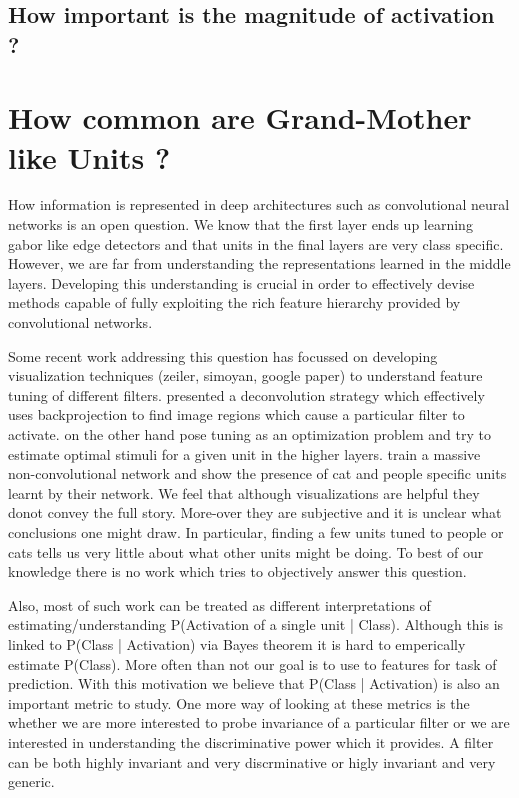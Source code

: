 \documentclass[runningheads]{llncs}
\begin{document}
\subsection{How important is the magnitude of activation ?}
\label{sub:imp-mag}





\section{How common are Grand-Mother like Units ?}
How information is represented in deep architectures such as convolutional neural networks is an open question. We know that the first layer ends up learning gabor like edge detectors and that units in the final layers are very class specific. However, we are far from understanding the representations learned in the middle layers. Developing this understanding is crucial in order to effectively devise methods capable of fully exploiting the rich feature hierarchy provided by convolutional networks.

Some recent work addressing this question has focussed on developing visualization techniques (zeiler, simoyan, google paper) to understand feature tuning of different filters. \cite{zeiler} presented a deconvolution strategy which effectively uses backprojection to find image regions which cause a particular filter to activate.  \cite{simoyan} on the other hand pose tuning as an optimization problem and try to estimate optimal stimuli for a given unit in the higher layers. \cite{google} train a massive non-convolutional network and show the presence of cat and people specific units learnt by their network. We feel that although visualizations are helpful they donot convey the full story. More-over they are subjective and it is unclear what conclusions one might draw. In particular, finding a few units tuned to people or cats tells us very little about what other units might be doing. To best of our knowledge there is no work which tries to objectively answer this question.

Also, most of such work can be treated as different interpretations of estimating/understanding P(Activation of a single unit | Class). Although this is linked to P(Class | Activation) via Bayes theorem it is hard to emperically estimate P(Class). More often than not our goal is to use to features for task of prediction. With this motivation we believe that P(Class | Activation) is also an important metric to study. One more way of looking at these metrics is the whether we are more interested to probe invariance of a particular filter or we are interested in understanding the discriminative power which it provides. A filter can be both highly invariant and very discrminative or higly invariant and very generic.  
\end{document}
